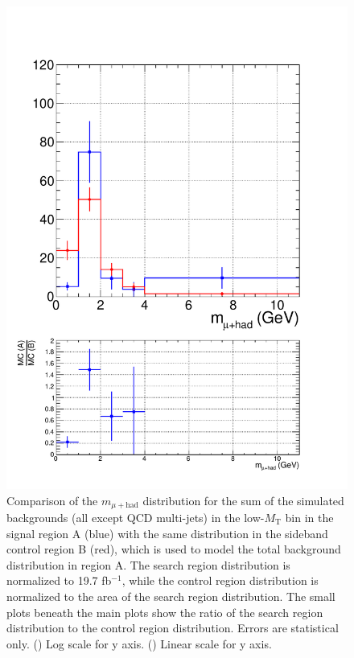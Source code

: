 \begin{figure}[hbtp]
\begin{center}
    \includegraphics[width=\cmsFigWidth]{figures/MCClosure_linear_lowMT_v87}
    \caption{Comparison of the $m_{\mu+\text{had}}$ distribution for the sum of the simulated backgrounds (all except QCD multi-jets) in the low-$M_{\text{T}}$ bin in the signal region A (blue) with the same distribution in the sideband control region B (red), which is used to model the total background distribution in region A.  The search region distribution is normalized to 19.7 fb$^{-1}$, while the control region distribution is normalized to the area of the search region distribution.  The small plots beneath the main plots show the ratio of the search region distribution to the control region distribution.  Errors are statistical only.  (\cmsLeft) Log scale for y axis.  (\cmsRight) Linear scale for y axis.}
    \label{fig:MC-regA-vs-regB-lowMT}
  \end{center}
\end{figure}

